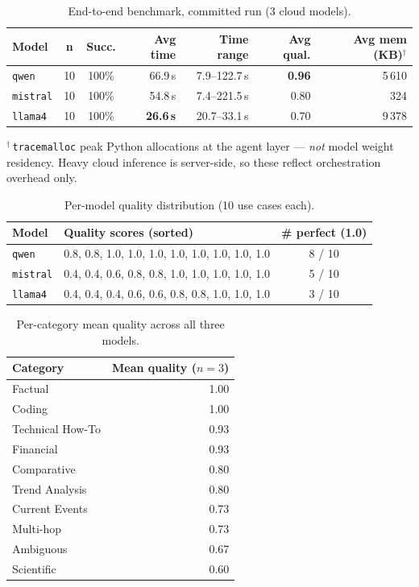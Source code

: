 \documentclass[11pt,a4paper]{article}
\begin{document}
\begin{table}[h]
\centering
\caption{End-to-end benchmark, committed run (3 cloud models).}
\label{tab:bench}
\small
\begin{tabularx}{\linewidth}{@{}l c c R R R R@{}}
\toprule
\textbf{Model} & \textbf{n} & \textbf{Succ.} & \textbf{Avg time} & \textbf{Time range} & \textbf{Avg qual.} & \textbf{Avg mem (KB)$^{\dagger}$} \\
\midrule
\texttt{qwen}    & 10 & 100\% & 66.9\,s & 7.9--122.7\,s & \textbf{0.96} & 5\,610 \\
\texttt{mistral} & 10 & 100\% & 54.8\,s & 7.4--221.5\,s & 0.80 & 324 \\
\texttt{llama4}  & 10 & 100\% & \textbf{26.6\,s} & 20.7--33.1\,s & 0.70 & 9\,378 \\
\bottomrule
\end{tabularx}
\par\vspace{2pt}
\footnotesize $^{\dagger}$\,\texttt{tracemalloc} peak Python allocations at the
agent layer --- \emph{not} model weight residency. Heavy cloud inference is
server-side, so these reflect orchestration overhead only.
\end{table}

\begin{table}[h]
\centering
\caption{Per-model quality distribution (10 use cases each).}
\label{tab:qdist}
\small
\begin{tabular}{@{}llc@{}}
\toprule
\textbf{Model} & \textbf{Quality scores (sorted)} & \textbf{\# perfect (1.0)} \\
\midrule
\texttt{qwen}    & 0.8, 0.8, 1.0, 1.0, 1.0, 1.0, 1.0, 1.0, 1.0, 1.0 & 8 / 10 \\
\texttt{mistral} & 0.4, 0.4, 0.6, 0.8, 0.8, 1.0, 1.0, 1.0, 1.0, 1.0 & 5 / 10 \\
\texttt{llama4}  & 0.4, 0.4, 0.4, 0.6, 0.6, 0.8, 0.8, 1.0, 1.0, 1.0 & 3 / 10 \\
\bottomrule
\end{tabular}
\end{table}

\begin{table}[h]
\centering
\caption{Per-category mean quality across all three models.}
\label{tab:qcat}
\small
\begin{tabular}{@{}lr@{}}
\toprule
\textbf{Category} & \textbf{Mean quality ($n=3$)} \\
\midrule
Factual          & 1.00 \\
Coding           & 1.00 \\
Technical How-To & 0.93 \\
Financial        & 0.93 \\
Comparative      & 0.80 \\
Trend Analysis   & 0.80 \\
Current Events   & 0.73 \\
Multi-hop        & 0.73 \\
Ambiguous        & 0.67 \\
Scientific       & 0.60 \\
\bottomrule
\end{tabular}
\end{table}
\end{document}
